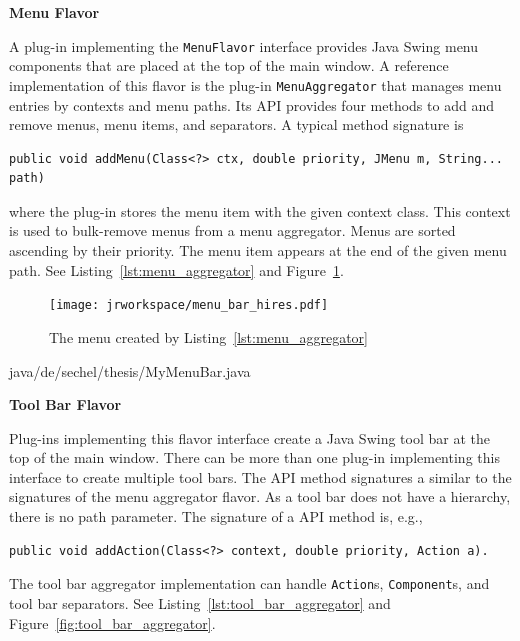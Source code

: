 \documentclass[Thesis.tex]{subfiles}
\begin{document}
{\bf Menu Flavor}

A plug-in implementing the {\tt MenuFlavor} interface provides {\sc Java Swing\TReg} menu 
components that are placed at the top of the main window. A reference implementation of this
flavor is the plug-in {\tt MenuAggregator} that manages menu entries by contexts and
menu paths. Its API provides four methods to add and remove menus, menu items, and
separators. A typical method signature is

\begin{lstlisting}[numbers=none]
	public void addMenu(Class<?> ctx, double priority, JMenu m, String... path)
\end{lstlisting}

where the plug-in stores the menu item with the given context class. This context is used to
bulk-remove menus from a menu aggregator. Menus are sorted ascending
by their priority. The menu item appears at the end of the given menu path. See 
Listing~\ref{lst:menu_aggregator} and Figure~\ref{fig:menu_aggregator}.


\begin{figure}[H]
\centering
\texttt{[image: jrworkspace/menu\_bar\_hires.pdf]}
\caption{The menu created by Listing~\ref{lst:menu_aggregator}}
\label{fig:menu_aggregator}
\end{figure}

 {java/de/sechel/thesis/MyMenuBar.java}

{\bf Tool Bar Flavor}

Plug-ins implementing this flavor interface create a {\sc Java Swing\TReg} tool bar at the top of the 
main window. There can be more than one plug-in implementing this interface to create multiple 
tool bars. The API method signatures a similar to the signatures of the menu aggregator flavor. As 
a tool bar does not have a hierarchy, there is no path parameter. The signature of a API method is, e.g.,

\begin{lstlisting}[numbers=none]
	public void addAction(Class<?> context, double priority, Action a).
\end{lstlisting}

The tool bar aggregator implementation can handle {\tt Action}s, {\tt Component}s, and tool bar
separators. See Listing~\ref{lst:tool_bar_aggregator} and Figure~\ref{fig:tool_bar_aggregator}.
\end{document}
